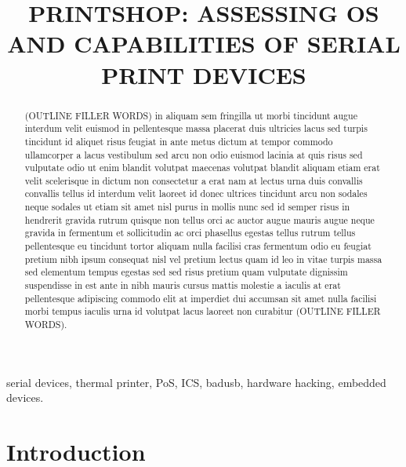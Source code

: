 \documentclass[conference]{IEEEtran}
\begin{document}
\title{PRINTSHOP: ASSESSING OS AND CAPABILITIES OF SERIAL PRINT DEVICES}

\author{
}

\maketitle

\begin{abstract}
(OUTLINE FILLER WORDS) in aliquam sem fringilla ut morbi tincidunt augue interdum velit euismod in pellentesque massa placerat duis ultricies lacus sed turpis tincidunt id aliquet risus feugiat in ante metus dictum at tempor commodo ullamcorper a lacus vestibulum sed arcu non odio euismod lacinia at quis risus sed vulputate odio ut enim blandit volutpat maecenas volutpat blandit aliquam etiam erat velit scelerisque in dictum non consectetur a erat nam at lectus urna duis convallis convallis tellus id interdum velit laoreet id donec ultrices tincidunt arcu non sodales neque sodales ut etiam sit amet nisl purus in mollis nunc sed id semper risus in hendrerit gravida rutrum quisque non tellus orci ac auctor augue mauris augue neque gravida in fermentum et sollicitudin ac orci phasellus egestas tellus rutrum tellus pellentesque eu tincidunt tortor aliquam nulla facilisi cras fermentum odio eu feugiat pretium nibh ipsum consequat nisl vel pretium lectus quam id leo in vitae turpis massa sed elementum tempus egestas sed sed risus pretium quam vulputate dignissim suspendisse in est ante in nibh mauris cursus mattis molestie a iaculis at erat pellentesque adipiscing commodo elit at imperdiet dui accumsan sit amet nulla facilisi morbi tempus iaculis urna id volutpat lacus laoreet non curabitur (OUTLINE FILLER WORDS).
\end{abstract}

\begin{IEEEkeywords}
serial devices, thermal printer, PoS, ICS, badusb, hardware hacking, embedded devices. 
\end{IEEEkeywords}

\section{Introduction}
\end{document}
